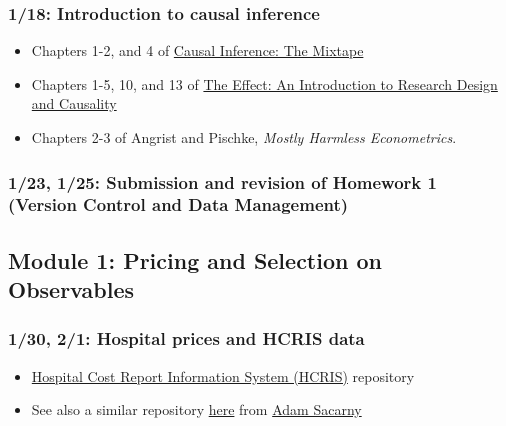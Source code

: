 \documentclass[11pt,]{article}
\providecommand{\tightlist}{%
  \setlength{\itemsep}{0pt}\setlength{\parskip}{0pt}}
\begin{document}
\hypertarget{introduction-to-causal-inference}{%
\subsubsection{1/18: Introduction to causal
inference}\label{introduction-to-causal-inference}}

\begin{itemize}
\tightlist
\item
  Chapters 1-2, and 4 of \href{https://mixtape.scunning.com/}{Causal
  Inference: The Mixtape}
\item
  Chapters 1-5, 10, and 13 of \href{https://theeffectbook.net/}{The
  Effect: An Introduction to Research Design and Causality}
\item
  Chapters 2-3 of Angrist and Pischke, \emph{Mostly {Harmless}
  {Econometrics}}.
\end{itemize}

\hypertarget{submission-and-revision-of-homework-1-version-control-and-data-management}{%
\subsubsection{1/23, 1/25: Submission and revision of Homework 1
(Version Control and Data
Management)}\label{submission-and-revision-of-homework-1-version-control-and-data-management}}

\hypertarget{module-1-pricing-and-selection-on-observables}{%
\subsection{Module 1: Pricing and Selection on
Observables}\label{module-1-pricing-and-selection-on-observables}}

\hypertarget{hospital-prices-and-hcris-data}{%
\subsubsection{1/30, 2/1: Hospital prices and HCRIS
data}\label{hospital-prices-and-hcris-data}}

\begin{itemize}
\tightlist
\item
  \href{https://github.com/imccart/HCRIS}{Hospital Cost Report
  Information System (HCRIS)} repository
\item
  See also a similar repository
  \href{https://github.com/asacarny/hospital-cost-reports}{here} from
  \href{http://sacarny.com/}{Adam Sacarny}
\end{itemize}
\end{document}
